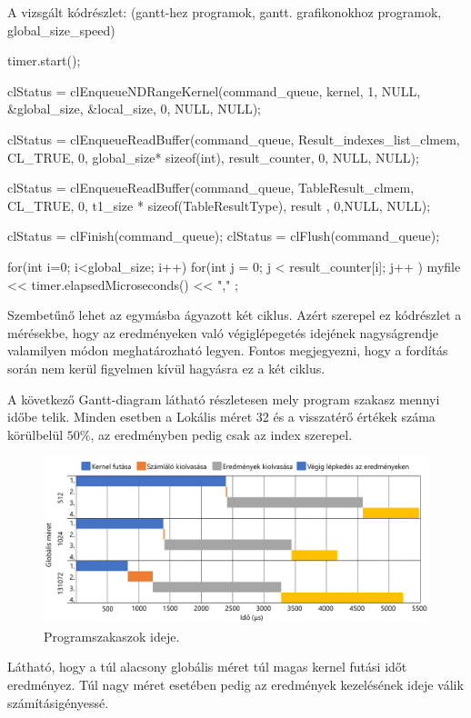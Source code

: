 A vizsgált kódrészlet: (gantt-hez programok, gantt. grafikonokhoz programok, global\_size\_speed)
\begin{python}  
timer.start();

clStatus = clEnqueueNDRangeKernel(command_queue, kernel, 1, NULL, 
	&global_size, &local_size, 0, NULL, NULL);

clStatus =
	clEnqueueReadBuffer(command_queue, Result_indexes_list_clmem, 
	CL_TRUE, 0, global_size* sizeof(int), 
	result_counter, 0, NULL, NULL);
	
clStatus = clEnqueueReadBuffer(command_queue, TableResult_clmem, 
	CL_TRUE, 0, t1_size * sizeof(TableResultType), 
	result  , 0,NULL, NULL);

clStatus = clFinish(command_queue);
clStatus = clFlush(command_queue);

for(int i=0; i<global_size; i++)
{
for(int j = 0; j < result_counter[i]; j++ ){}
}
myfile << timer.elapsedMicroseconds() << "," ;  
\end{python}

Szembetűnő lehet az egymásba ágyazott két ciklus. Azért szerepel ez kódrészlet a mérésekbe, hogy az eredményeken való végiglépegetés idejének nagyságrendje valamilyen módon meghatározható legyen. Fontos megjegyezni, hogy a fordítás során nem kerül figyelmen kívül hagyásra ez a két ciklus.

A következő Gantt-diagram látható részletesen mely program szakasz mennyi időbe telik.
Minden esetben a Lokális méret 32 és a visszatérő értékek száma körülbelül $50\%$, az eredményben pedig csak az index szerepel.

\begin{figure}[h!]
\centering
\includegraphics[width=\textwidth]{images/gantt.png}
\caption{Programszakaszok ideje.}
\label{fig:schema}
\end{figure}

Látható, hogy a túl alacsony globális méret túl magas kernel futási időt eredményez. Túl nagy méret esetében pedig az eredmények kezelésének ideje válik számításigényessé.

